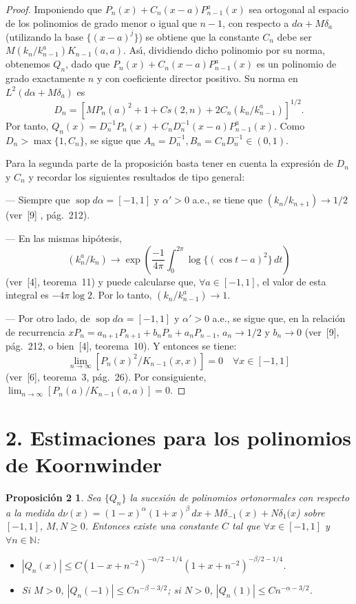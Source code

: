 \documentclass[a4paper,12pt]{article}
\theoremstyle{plain}
\newtheorem*{propoDos}{Proposici\'on 2}
\theoremstyle{definition}
\newcommand{\parrafo}[1]{\section*{\large #1}}
\newcommand{\sop}{\operatorname{sop}}
\newcommand{\N}{\mathbb{N}}
\begin{document}
\begin{proof}
Imponiendo que $P_{n}(x) + C_{n}(x-a)P_{n-1}^{a}(x)$
sea ortogonal al espacio de los polinomios de grado menor o igual
que $n-1$, con respecto a $d\alpha + M\delta_{a}$ (utilizando
la base $\{(x-a)^{j}\}$) se obtiene que la constante $C_{n}$ debe ser
$M(k_{n}/k_{n-1}^{a})K_{n-1}(a,a)$. As\'{\i}, dividiendo dicho polinomio
por su norma, obtenemos $Q_{n}$, dado que $P_{n}(x)+C_{n}(x-a)P_{n-1}^{a}(x)$
es un polinomio de grado exactamente $n$ y con coeficiente director
positivo. Su norma en $L^{2}(d\alpha + M\delta_{a})$ es
$$
D_{n} = [ M P_{n}(a)^{2} + 1 + Cs(2,n) + 2 C_{n} (k_{n}/k_{n-1}^{a}) ]^{1/2}.
$$
Por tanto, $Q_{n}(x) = D_{n}^{-1} P_{n}(x) + C_{n} D_{n}^{-1} (x-a)P_{n-1}^{a}(x)$.
Como $D_{n} > \max\{1,C_{n}\}$,
se sigue que $A_{n} = D_{n}^{-1}, B_{n} = C_{n} D_{n}^{-1} \in (0,1)$.

Para la segunda parte de la proposici\'on basta tener en cuenta
la expresi\'on de $D_{n}$ y $C_{n}$ y recordar los siguientes resultados
de tipo general:

--- Siempre que $\sop d\alpha = [-1,1]$ y $\alpha' > 0$
a.e., se tiene que $(k_{n}/k_{n+1}) \to 1/2$
(ver~[9] , p\'ag.~212).

--- En las mismas hip\'otesis,
$$
(k_{n}^{a}/k_{n}) \to \exp \left(\frac{-1}{4\pi}
\int_{0}^{2\pi} \log\{(\cos t-a)^{2}\}\,dt\right)
$$
(ver~[4], teorema~11) y
puede calcularse que, $\forall a \in [-1,1]$, el valor de esta
integral es $-4\pi \log 2$. Por lo tanto,
$(k_{n}/k_{n-1}^{a}) \to 1$.

--- Por otro lado, de $\sop d\alpha = [-1,1]$ y $\alpha' > 0$ a.e.,
se sigue que, en la relaci\'on de recurrencia $x P_{n}
= a_{n+1}P_{n+1} + b_{n} P_{n} + a_{n} P_{n-1}$, $a_{n} \to 1/2$ y $b_{n} \to 0$
(ver~[9], p\'ag.~212, o bien~[4], teorema~10). Y entonces se
tiene:
$$
\lim_{n\to\infty} [P_{n}(x)^{2}/K_{n-1}(x,x)] = 0
\quad\forall x \in [-1,1]
$$
(ver~[6], teorema~3, p\'ag.~26).
Por consiguiente, $\lim_{n\to\infty} [P_{n}(a)/K_{n-1}(a,a)] = 0$.
\end{proof}

\parrafo{2. Estimaciones para los polinomios de Koornwinder}

\begin{propoDos}
Sea $\{Q_{n}\}$ la sucesi\'on de polinomios
ortonormales con respecto a la medida $d\nu(x) = (1-x)^{\alpha}(1+x)^{\beta}\,dx
+ M\delta_{-1}(x) + N\delta_{1}(x$) sobre $[-1,1]$, $M,N \geq 0$.
Entonces existe una constante $C$ tal que $\forall x\in [-1,1]$
y $\forall n\in \N$:
\begin{itemize}
\item[(a)] $|Q_{n}(x)| \leq C (1-x + n^{-2})^{-\alpha/2-1/4}
(1+x + n^{-2})^{-\beta/2-1/4}$.

\item[(b)] Si $M>0$, $|Q_{n}(-1)| \leq C n^{-\beta-3/2}$;
si $N>0$, $|Q_{n}(1)| \leq C n^{-\alpha-3/2}$.
\end{itemize}
\end{propoDos}
\end{document}
